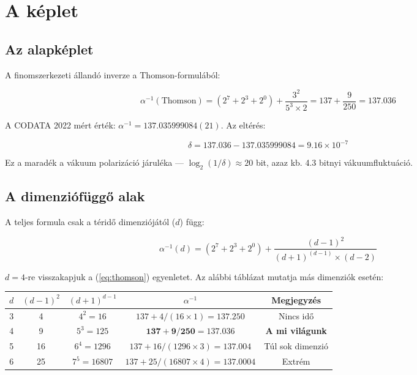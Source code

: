 \documentclass[11pt,a4paper,twoside]{book}
\begin{document}
\chapter{A képlet}

\section{Az alapképlet}

A finomszerkezeti állandó inverze a Thomson-formulából:

\begin{equation}\label{eq:thomson}
\boxed{\alpha^{-1}(\text{Thomson}) = (2^7 + 2^3 + 2^0) + \frac{3^2}{5^3 \times 2} = 137 + \frac{9}{250} = 137.036}
\end{equation}

A CODATA 2022 mért érték: $\alpha^{-1} = 137.035999084(21)$. Az eltérés:

\begin{equation}
\delta = 137.036 - 137.035999084 = 9.16 \times 10^{-7}
\end{equation}

Ez a maradék a vákuum polarizáció járuléka — $\log_2(1/\delta) \approx 20$ bit, azaz kb. 4.3 bitnyi vákuumfluktuáció.

\section{A dimenziófüggő alak}

A teljes formula csak a téridő dimenziójától ($d$) függ:

\begin{equation}\label{eq:dimdep}
\boxed{\alpha^{-1}(d) = (2^7+2^3+2^0) + \frac{(d-1)^2}{(d+1)^{(d-1)} \times (d-2)}}
\end{equation}

$d=4$-re visszakapjuk a (\ref{eq:thomson}) egyenletet. Az alábbi táblázat mutatja más dimenziók esetén:

\begin{center}
\begin{tabular}{c|c|c|c|c}
$d$ & $(d-1)^2$ & $(d+1)^{d-1}$ & $\alpha^{-1}$ & Megjegyzés\\
\hline
3 & 4   & $4^2=16$   & $137+4/(16\times1)=137.250$ & Nincs idő \\
4 & 9   & $5^3=125$  & $\mathbf{137+9/250=137.036}$ & \textbf{A mi világunk} \\
5 & 16  & $6^4=1296$ & $137+16/(1296\times3)=137.004$ & Túl sok dimenzió \\
6 & 25  & $7^5=16807$& $137+25/(16807\times4)=137.0004$ & Extrém \\
\end{tabular}
\end{center}
\end{document}
